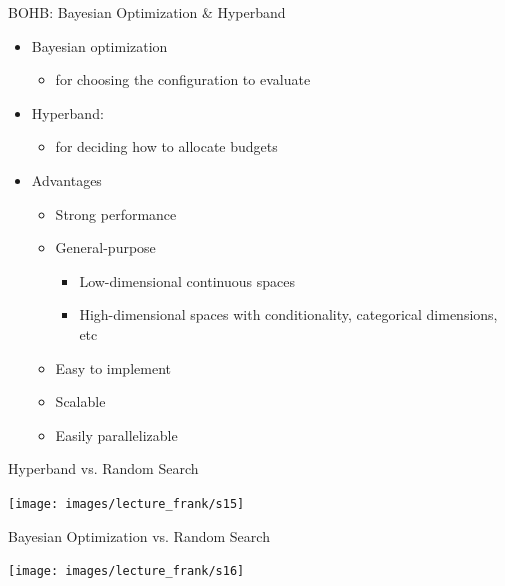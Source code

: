 \begin{frame}[c]{BOHB: Bayesian Optimization \& Hyperband}
\vspace*{-1.65cm}
\begin{itemize}
	\item \alert{Bayesian optimization}
	\begin{itemize}
		\item for choosing the configuration to evaluate
	\end{itemize}
	\item \alert{Hyperband}:
	\begin{itemize}
		\item for deciding how to allocate budgets
	\end{itemize}
	\item \alert{Advantages}
	\begin{itemize}
		\item Strong performance
		\item General-purpose
		\begin{itemize}
			\item Low-dimensional continuous spaces
			\item High-dimensional spaces with conditionality, categorical dimensions, etc
		\end{itemize}
		\item Easy to implement
		\item Scalable
		\item Easily parallelizable
	\end{itemize}
\end{itemize}
\end{frame}
{
\begin{frame}[c]{Hyperband vs. Random Search}

{\centering
	\texttt{[image: images/lecture\_frank/s15]}
}
\end{frame}
}
{
\begin{frame}[c]{Bayesian Optimization vs. Random Search}

{\centering
	\texttt{[image: images/lecture\_frank/s16]}
}
\end{frame}
}
